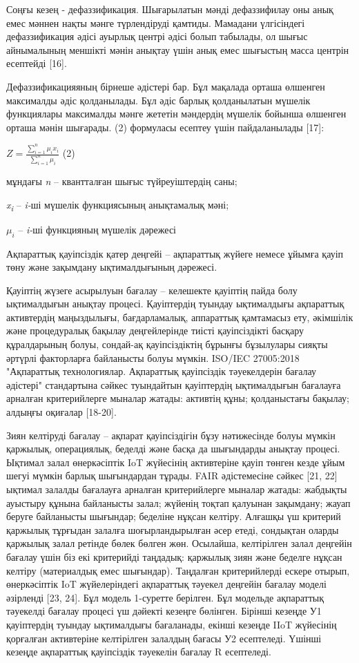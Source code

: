 \documentclass[
]{article}
\begin{document}
Соңғы кезең - дефаззификация. Шығарылатын мәнді дефаззифилау оны анық
емес мәннен нақты мәнге түрлендіруді қамтиды. Мамадани үлгісіндегі
дефаззификация әдісі ауырлық центрі әдісі болып табылады, ол шығыс
айнымалының меншікті мәнін анықтау үшін анық емес шығыстың масса центрін
есептейді {[}16{]}.

Дефаззификацияяның бірнеше әдістері бар. Бұл мақалада орташа өлшенген
максималды әдіс қолданылады. Бұл әдіс барлық қолданылатын мүшелік
функциялары максималды мәнге жететін мәндердің мүшелік бойынша өлшенген
орташа мәнін шығарады. (2) формуласы есептеу үшін пайдаланылады
{[}17{]}:

\(Z = \frac{\sum_{i = 1}^{n}{\mu_{i}x_{i}}}{\sum_{i = 1}^{n}\mu_{i}}\)
(2)

мұндағы \emph{n} -- квантталған шығыс түйреуіштердің саны;

\emph{x\textsubscript{i}} -- \emph{i-}ші мүшелік функциясының
анықтамалық мәні;

\(\mu_{i}\) -- \emph{i-}ші функцияның мүшелік дәрежесі

Ақпараттық қауіпсіздік қатер деңгейі -- ақпараттық жүйеге немесе ұйымға
қауіп төну және зақымдану ықтималдығының дәрежесі.

Қауіптің жүзеге асырылуын бағалау -- келешекте қауіптің пайда болу
ықтималдығын анықтау процесі. Қауіптердің туындау ықтималдығы ақпараттық
активтердің маңыздылығы, бағдарламалық, аппараттық қамтамасыз ету,
әкімшілік және процедуралық бақылау деңгейлерінде тиісті қауіпсіздікті
басқару құралдарының болуы, сондай-ақ қауіпсіздіктің бұрынғы бұзылулары
сияқты әртүрлі факторларға байланысты болуы мүмкін. ISO/IEC 27005:2018
"Ақпараттық технологиялар. Ақпараттық қауіпсіздік тәуекелдерін бағалау
әдістері" стандартына сәйкес туындайтын қауіптердің ықтималдығын
бағалауға арналған критерийлерге мыналар жатады: активтің құны;
қолданыстағы бақылау; алдыңғы оқиғалар {[}18-20{]}.

Зиян келтіруді бағалау -- ақпарат қауіпсіздігін бұзу нәтижесінде болуы
мүмкін қаржылық, операциялық, беделді және басқа да шығындарды анықтау
процесі. Ықтимал залал өнеркәсіптік IoT жүйесінің активтеріне қауіп
төнген кезде ұйым шегуі мүмкін барлық шығындардан тұрады. FAIR
әдістемесіне сәйкес {[}21, 22{]} ықтимал залалды бағалауға арналған
критерийлерге мыналар жатады: жабдықты ауыстыру құнына байланысты залал;
жүйенің тоқтап қалуынан зақымдану; жауап беруге байланысты шығындар;
беделіне нұқсан келтіру. Алғашқы үш критерий қаржылық тұрғыдан залалға
шоғырландырылған әсер етеді, сондықтан оларды қаржылық залал ретінде
бөлек бөлген жөн. Осылайша, келтірілген залал деңгейін бағалау үшін біз
екі критерийді таңдадық: қаржылық зиян және беделге нұқсан келтіру
(материалдық емес шығындар). Таңдалған критерийлерді ескере отырып,
өнеркәсіптік IoT жүйелеріндегі ақпараттық тәуекел деңгейін бағалау
моделі әзірленді {[}23, 24{]}. Бұл модель 1-суретте берілген. Бұл
модельде ақпараттық тәуекелді бағалау процесі үш дәйекті кезеңге
бөлінген. Бірінші кезеңде У1 қауіптердің туындау ықтималдығы бағаланады,
екінші кезеңде IIoT жүйесінің қорғалған активтеріне келтірілген залалдың
бағасы У2 есептеледі. Үшінші кезеңде ақпараттық қауіпсіздік тәуекелін
бағалау R есептеледі.
\end{document}
